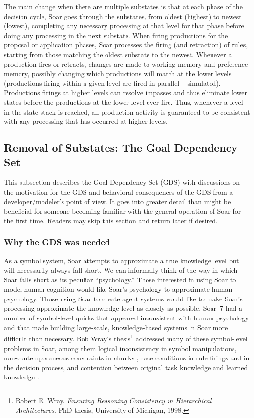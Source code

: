 The main change when there are multiple substates is that at each phase of the decision cycle, Soar goes through the substates, from oldest (highest) to newest (lowest), completing any necessary processing at that level for that phase before doing any processing in the next substate.  When firing productions for the proposal or application phases, Soar processes the firing (and retraction) of rules, starting from those matching the oldest substate to the newest.  Whenever a production fires or retracts, changes are made to working memory and preference memory, possibly changing which productions will match at the lower levels (productions firing within a given level are fired in parallel -- simulated). Productions firings at higher levels can resolve impasses and thus eliminate lower states before the productions at the lower level ever fire.  Thus, whenever a level in the state stack is reached, all production activity is guaranteed to be consistent with any processing that has occurred at higher levels.

\subsection{Removal of Substates: The Goal Dependency Set}
This subsection describes the Goal Dependency Set (GDS) with discussions on the motivation for the GDS and behavioral consequences of the GDS from a developer/modeler's point of view. It goes into greater detail than might be beneficial for someone becoming familiar with the general operation of Soar for the first time. Readers may skip this section and return later if desired.

\subsubsection{Why the GDS was needed}

As a symbol system, Soar attempts to approximate a true knowledge level but will necessarily always fall short\cite{Newell90:UTC}.  We can informally think of the way in which Soar falls short as its peculiar ``psychology.''  Those interested in using Soar to model human cognition would like Soar's psychology to approximate human psychology. Those using Soar to create agent systems would like to make Soar's processing approximate the knowledge level as closely as possible. Soar~7 had a number of symbol-level quirks that appeared inconsistent with human psychology and that made building large-scale, knowledge-based systems in Soar more difficult than necessary. Bob Wray's thesis\footnote{
	Robert E. Wray. \textit{Ensuring Reasoning Consistency in Hierarchical Architectures}. PhD thesis, University of Michigan, 1998.}
addressed many of these symbol-level problems in Soar, among them logical inconsistency in symbol manipulations, non-contemporaneous constraints in chunks \cite{Wray96:Compilation}, race conditions in rule firings and in the decision process, and contention between original task knowledge and learned knowledge \cite{Wray01:Resolving}.

